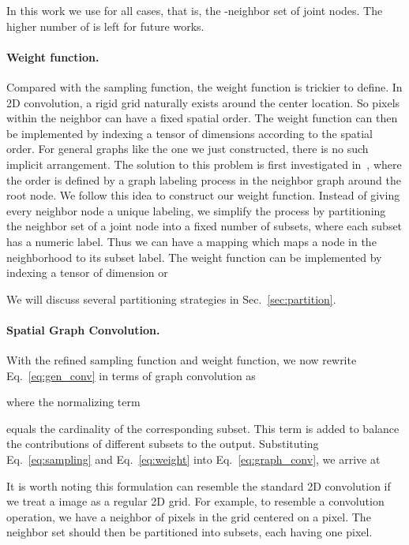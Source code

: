 \documentclass[letterpaper]{article} \usepackage{aaai18}  \usepackage{times}  \usepackage{helvet}  \usepackage{courier}  \usepackage{url}  \usepackage{graphicx}
\begin{document}
In this work we use  for all cases, that is, the -neighbor set of joint nodes.
The higher number of  is left for future works.

\paragraph{Weight function.}
Compared with the sampling function, the weight function is trickier to define.
In 2D convolution, a rigid grid naturally exists around the center location. 
So pixels within the neighbor can have a fixed spatial order. 
The weight function can then be implemented by indexing a tensor of  dimensions according to the spatial order.
For general graphs like the one we just constructed, there is no such implicit arrangement.
The solution to this problem is first investigated in~\cite{Niepert2016ICML}, where the order is defined by a graph labeling process in the neighbor graph around the root node.
We follow this idea to construct our weight function.
Instead of giving every neighbor node a unique labeling, we simplify the process by partitioning the neighbor set  of a joint node  into a fixed number of  subsets, where each subset has a numeric label.
Thus we can have a mapping  which maps a node in the neighborhood to its subset label.
The weight function  can be implemented by indexing a tensor of  dimension or

We will discuss several partitioning strategies in Sec.~\ref{sec:partition}.

\paragraph{Spatial Graph Convolution.}
With the refined sampling function and weight function, we now rewrite Eq.~\ref{eq:gen_conv} in terms of graph convolution as

where the normalizing term 

equals the cardinality of the corresponding subset.
This term is added to balance the contributions of different subsets to the output.
Substituting Eq.~\ref{eq:sampling} and Eq.~\ref{eq:weight} into Eq.~\ref{eq:graph_conv}, we arrive at

It is worth noting this formulation can resemble the standard 2D convolution if we treat a image as a regular 2D grid.
For example, to resemble a  convolution operation, we have a neighbor of  pixels in the  grid centered on a pixel. 
The neighbor set should then be partitioned into  subsets, each having one pixel.
\end{document}
